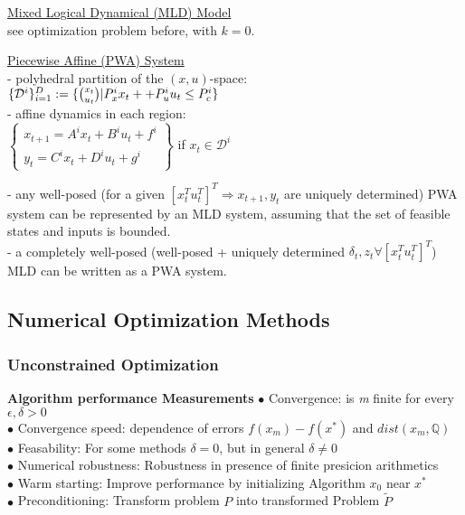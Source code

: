 \documentclass[10pt,parskip]{scrartcl}
\begin{document}
\begin{multicols*}{3}
\underline{Mixed Logical Dynamical (MLD) Model}\\
see optimization problem before, with $k = 0$.

\underline{Piecewise Affine (PWA) System}\\
- polyhedral partition of the $(x, u)$-space:\\
 \hspace*{8mm}$ \{\mathcal D^i\}_{i=1}^D := \{\tbinom{x_t}{u_t} | P_x^i x_t + + P_u^i u_t \leq P_c^i\}$\\
- affine dynamics in each region:\\
\hspace*{8mm} $\left \{  \begin{matrix}
x_{t+1} = A^i x_t + B^i u_t + f^i\\
y_t = C^i x_t + D^i u_t + g^i
\end{matrix} \right \}
$ if $ x_t \in \mathcal D^i$

- any well-posed (for a given $[x_t^T u_t^T]^T \Rightarrow x_{t+1}, y_t$ are uniquely determined) PWA system can be represented by an MLD system, assuming that the set of feasible states and inputs is bounded.\\
- a completely well-posed (well-posed + uniquely determined $\delta_t, z_t \forall [x_t^T u_t^T]^T$) MLD can be written as a PWA system.


\subsection{Numerical Optimization Methods}
\subsubsection{Unconstrained Optimization}
\textbf{Algorithm performance Measurements}
$\bullet$ Convergence: is \textit{m} finite for every $\epsilon, \delta > 0$\\
$\bullet$ Convergence speed: dependence of errors $f(x_m) - f(x^*)$ and $dist(x_m, \mathbb{Q})$\\
$\bullet$ Feasability: For some methods $\delta=0$, but in general $\delta \neq 0$\\
$\bullet$ Numerical robustness: Robustness in presence of finite presicion arithmetics\\
$\bullet$ Warm starting: Improve performance by initializing Algorithm $x_0$ near $x^*$\\
$\bullet$ Preconditioning: Transform problem $P$ into transformed Problem $\tilde{P}$



\end{multicols*}
\end{document}
